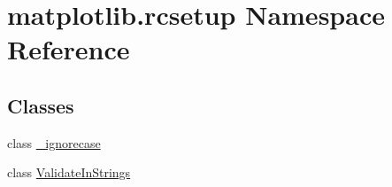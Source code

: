 \hypertarget{namespacematplotlib_1_1rcsetup}{}\section{matplotlib.\+rcsetup Namespace Reference}
\label{namespacematplotlib_1_1rcsetup}
\subsection*{Classes}
\begin{DoxyCompactItemize}
\item 
class \hyperlink{classmatplotlib_1_1rcsetup_1_1__ignorecase}{\+\_\+ignorecase}
\item 
class \hyperlink{classmatplotlib_1_1rcsetup_1_1ValidateInStrings}{Validate\+In\+Strings}
\end{DoxyCompactItemize}
